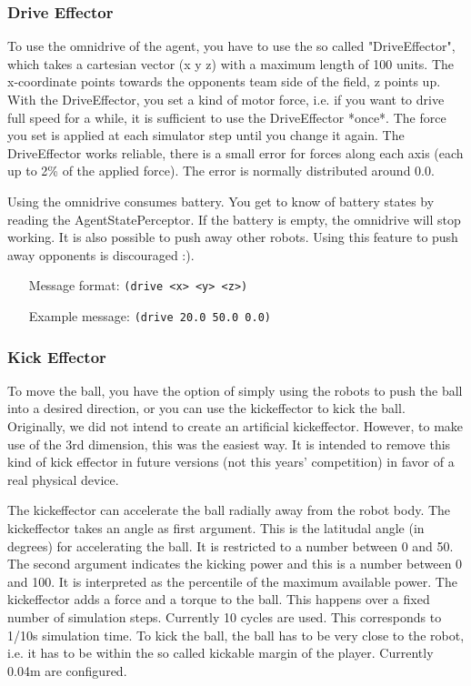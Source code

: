 \subsubsection{Drive Effector}
To use the omnidrive of the agent, you have to use the so called
"DriveEffector", which takes a cartesian vector (x y z) with a maximum
length of 100 units. The x-coordinate points towards the opponents
team side of the field, z points up. With the DriveEffector, you set a
kind of motor force, i.e. if you want to drive full speed for a while,
it is sufficient to use the DriveEffector *once*. The force you set is
applied at each simulator step until you change it again. The
DriveEffector works reliable, there is a small error for forces along
each axis (each up to 2\% of the applied force). The error is normally
distributed around 0.0.

Using the omnidrive consumes battery. You get to know of battery
states by reading the AgentStatePerceptor. If the battery is empty,
the omnidrive will stop working. It is also possible to push away
other robots. Using this feature to push away opponents is discouraged
:).

\begin{itemize}
	\item[Message format:] \texttt{(drive <x> <y> <z>)}
	\item[Example message:] \texttt{(drive 20.0 50.0 0.0)}
\end{itemize}


\subsubsection{Kick Effector}
To move the ball, you have the option of simply using the robots to
push the ball into a desired direction, or you can use the
kickeffector to kick the ball. Originally, we did not intend to create
an artificial kickeffector. However, to make use of the 3rd dimension,
this was the easiest way. It is intended to remove this kind of kick
effector in future versions (not this years' competition) in favor of
a real physical device.

The kickeffector can accelerate the ball radially away from the robot
body. The kickeffector takes an angle as first argument. This is the
latitudal angle (in degrees) for accelerating the ball. It is
restricted to a number between 0 and 50. The second argument indicates
the kicking power and this is a number between 0 and 100. It is
interpreted as the percentile of the maximum available power. The
kickeffector adds a force and a torque to the ball. This happens over
a fixed number of simulation steps. Currently 10 cycles are used. This
corresponds to 1/10s simulation time. To kick the ball, the ball has
to be very close to the robot, i.e. it has to be within the so called
kickable margin of the player. Currently 0.04m are configured.

